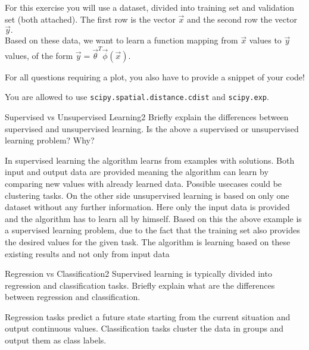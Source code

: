 For this exercise you will use a dataset, divided into training set and validation set (both attached). The first row is the vector $\vec x$ and the second row the vector $\vec y.$
\\
Based on these data, we want to learn a function mapping from $\vec x$ values to $\vec y$ values, of the form $\vec y=\vec{\theta}^{T}\vec{\phi}(\vec x)$.

For all questions requiring a plot, you also have to provide a snippet of your code!

You are allowed to use \texttt{scipy.spatial.distance.cdist} and \texttt{scipy.exp}.

\begin{questions}
	
	
	\begin{question}{Supervised vs Unsupervised Learning}{2}
		Briefly explain the differences between supervised and unsupervised learning. 
		Is the above a supervised or unsupervised learning problem? Why?

\begin{answer}
	
	In supervised learning the algorithm learns from examples with solutions. Both input and output data are provided meaning the algorithm can learn by comparing new values with already learned data. Possible usecases could be clustering tasks.
	On the other side unsupervised learning is based on only one dataset without any further information. Here only the input data is provided and the algorithm has to learn all by himself. Based on this the above example is a supervised learning problem, due to the fact that the training set also provides the desired values for the given task. The algorithm is learning based on these existing results and not only from input data

\end{answer}
	\end{question}
	
	
	
	\begin{question}{Regression vs Classification}{2}
		Supervised learning is typically divided into regression and classification tasks. 
		Briefly explain what are the differences between regression and classification.
		
\begin{answer}
Regression tasks predict a future state starting from the current situation and output continuous values.
Classification tasks cluster the data in groups and output them as class labels.
\end{answer}
\end{question}
	

\end{questions}
